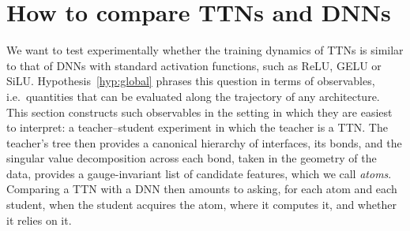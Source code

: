 \documentclass[11pt]{article}
\theoremstyle{definition}
\numberwithin{equation}{section}
\begin{document}
\section{How to compare TTNs and DNNs}\label{sec:compare}

We want to test experimentally whether the training dynamics of TTNs is similar to that of DNNs with standard activation functions, such as ReLU, GELU or SiLU. Hypothesis~\ref{hyp:global} phrases this question in terms of observables, i.e.\ quantities that can be evaluated along the trajectory of any architecture. This section constructs such observables in the setting in which they are easiest to interpret: a teacher--student experiment in which the teacher is a TTN. The teacher's tree then provides a canonical hierarchy of interfaces, its bonds, and the singular value decomposition across each bond, taken in the geometry of the data, provides a gauge-invariant list of candidate features, which we call \emph{atoms}. Comparing a TTN with a DNN then amounts to asking, for each atom and each student, when the student acquires the atom, where it computes it, and whether it relies on it.
\end{document}
